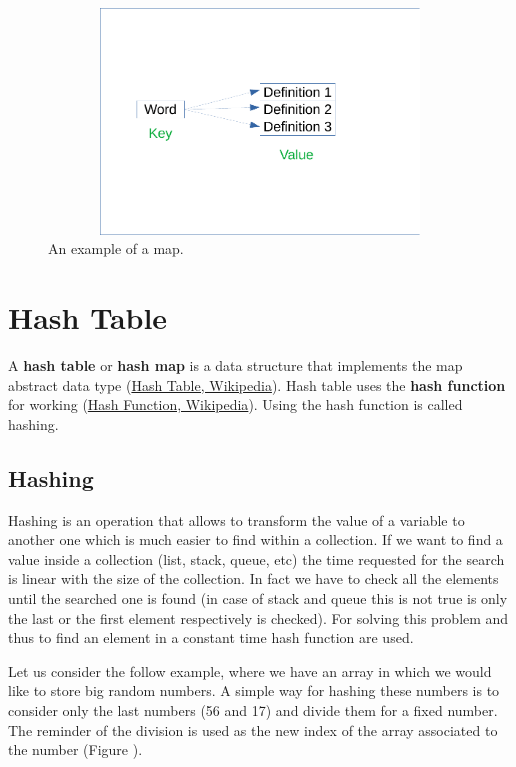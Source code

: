 \begin{figure}[h]
	\includegraphics[width=14cm,height=6cm]{chapters/datastructures/images/map_1.pdf}
	\caption[]{An example of a map.}
	\label{map_1}
\end{figure}

\section{Hash Table}
A \textbf{hash table} or \textbf{hash map} is a data structure that implements the map abstract data type \cite{wikihashtable} (\href{https://en.wikipedia.org/wiki/Hash_table}{Hash Table, Wikipedia}). Hash table uses the \textbf{hash function} for working \cite{wikihashfunction} (\href{https://en.wikipedia.org/wiki/Hash_function}{Hash Function, Wikipedia}). Using the hash function is called hashing.

\subsection{Hashing}
Hashing is an operation that allows to transform the value of a variable to another one which is much easier to find within a collection. If we want to find a value inside a collection (list, stack, queue, etc) the time requested for the search is linear with the size of the collection. In fact we have to check all the elements until the searched one is found (in case of stack and queue this is not true is only the last or the first element respectively is checked). For solving this problem and thus to find an element in a constant time hash function are used. 

Let us consider the follow example, where we have an array in which we would like to store big random numbers. A simple way for hashing these numbers is to consider only the last numbers (56 and 17) and divide them for a fixed number. The reminder of the division is used as the new index of the array associated to the number (Figure ).

